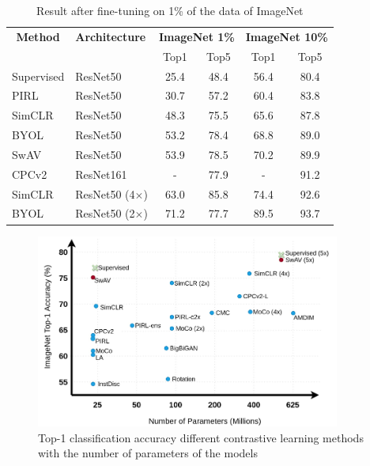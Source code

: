 \begin{table}[H]
	\centering
	\begin{tabular}{|l|l|cc|cc|}
		\hline
		\multicolumn{1}{|c|}{\textbf{Method}} & \textbf{Architecture} & \multicolumn{2}{c|}{\textbf{ImageNet 1\%}} & \multicolumn{2}{c|}{\textbf{ImageNet 10\%}} \\
		\multicolumn{1}{|c|}{} &  & Top1 & Top5 & Top1 & Top5  \\
		\hline
		Supervised & ResNet50 & 25.4 & 48.4 & 56.4 & 80.4 \\
		PIRL & ResNet50 & 30.7 & 57.2  & 60.4 & 83.8 \\
		SimCLR & ResNet50 & 48.3 & 75.5  & 65.6 & 87.8 \\
		BYOL & ResNet50  & 53.2 & 78.4  & 68.8 & 89.0 \\ 
		SwAV & ResNet50 & 53.9 & 78.5  & 70.2 & 89.9 \\
		CPCv2 & ResNet161 & - & 77.9 & - & 91.2 \\
		SimCLR & ResNet50 (4$\times$) & 63.0 & 85.8 & 74.4 & 92.6 \\
		BYOL & ResNet50 (2$\times$) & 71.2 & 77.7 & 89.5 & 93.7 \\
		\hline
	\end{tabular}
	\caption{Result after fine-tuning on 1\% of the data of ImageNet}
	\label{tab:imagenet-1-perc-semisup}
\end{table}


\begin{figure}[H]
	\centering
	\includegraphics[width=10cm]{./images/imagenet-top1-acc-comp.png}
	\caption{Top-1 classification accuracy different contrastive learning methods with the number of parameters of the models}
	\label{fig:imagenet-top1-acc-comp}
\end{figure}